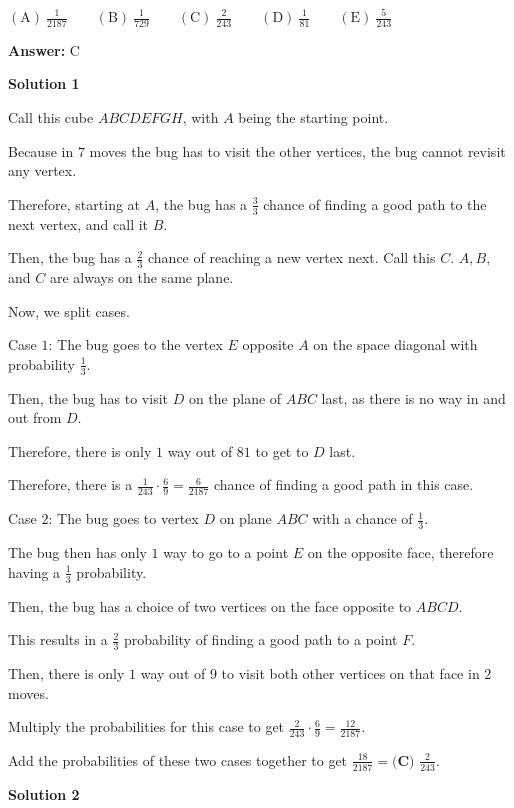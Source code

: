 \begin{enumerate}
 $\mathrm{(A)}\ \frac{1}{2187}\qquad\mathrm{(B)}\ \frac{1}{729}\qquad\mathrm{(C)}\ \frac{2}{243}\qquad\mathrm{(D)}\ \frac{1}{81}\qquad\mathrm{(E)}\ \frac{5}{243}$

 \textbf{Answer: }C



\textbf{Solution 1}

Call this cube $ABCDEFGH$, with $A$ being the starting point.

 Because in $7$ moves the bug has to visit the other vertices, the bug cannot revisit any vertex.

 Therefore, starting at $A$, the bug has a $\frac{3}{3}$ chance of finding a good path to the next vertex, and call it $B$.

 Then, the bug has a $\frac{2}{3}$ chance of reaching a new vertex next. Call this $C$. $A, B,$ and $C$ are always on the same plane.

 Now, we split cases.

 Case $1$: The bug goes to the vertex $E$ opposite $A$ on the space diagonal with probability $\frac{1}{3}$.

 Then, the bug has to visit $D$ on the plane of $ABC$ last, as there is no way in and out from $D$.

 Therefore, there is only $1$ way out of $81$ to get to $D$ last.

 Therefore, there is a $\frac{1}{243} \cdot \frac{6}{9} = \frac{6}{2187}$ chance of finding a good path in this case.

 Case $2$: The bug goes to vertex $D$ on plane $ABC$ with a chance of $\frac{1}{3}$.

 The bug then has only $1$ way to go to a point $E$ on the opposite face, therefore having a $\frac{1}{3}$ probability.

 Then, the bug has a choice of two vertices on the face opposite to $ABCD$.

 This results in a $\frac{2}{3}$ probability of finding a good path to a point $F$.

 Then, there is only $1$ way out of $9$ to visit both other vertices on that face in $2$ moves.

 Multiply the probabilities for this case to get $\frac{2}{243} \cdot \frac{6}{9} = \frac{12}{2187}$.

 Add the probabilities of these two cases together to get $\frac{18}{2187} = \boxed{\textbf{(C) }\frac{2}{243}}.$




\textbf{Solution 2}



\end{enumerate}
